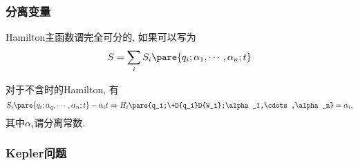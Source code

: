 \documentclass[../TheoreticalMechanics.tex]{subfiles}
\begin{document}

\subsubsection{分离变量} %
\label{ssub:分离变量}

\begin{definition}[完全可分的Hamilton主函数]
    Hamilton主函数谓完全可分的, 如果可以写为
    \[ S = \sum_i S_i\pare{q_i;\alpha_1,\cdots,\alpha_n;t} \]
\end{definition}
\begin{lemma}[Hamilton的分离常数]
    对于不含时的Hamilton, 有
    \[ S_i\pare{q_i;\alpha_q,\cdots,\alpha_n;t} - \alpha_i t \Rightarrow H_i\pare{q_i;\+D{q_i}D{W_i};\alpha_1,\cdots,\alpha_n} = \alpha_i. \]
    其中$\alpha_i$谓分离常数.
\end{lemma}


\subsubsection{Kepler问题} %
\label{ssub:kepler问题}
\end{document}
